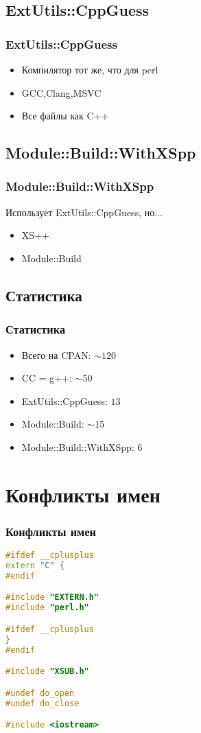 \documentclass[utf8x,smaller]{beamer}
\begin{document}
\subsection{ExtUtils::CppGuess}
\begin{frame}[fragile]
    \frametitle{ExtUtils::CppGuess}
    
    \begin{itemize}
        \item Компилятор тот же, что для perl
        \item GCC,Clang,MSVC
        \item Все файлы как C++
    \end{itemize}
\end{frame}

\subsection{Module::Build::WithXSpp}
\begin{frame}
    \frametitle{Module::Build::WithXSpp}
    Использует ExtUtils::CppGuess, но...
    \begin{itemize}
        \item XS++
        \item Module::Build
    \end{itemize}
\end{frame}

\subsection{Статистика}
\begin{frame}
    \frametitle{Статистика}
    \begin{itemize}
        \item Всего на CPAN: $\sim120$
        \item CC = g++: $\sim50$
        \item ExtUtils::CppGuess: $13$
        \item Module::Build: $\sim15$
        \item Module::Build::WithXSpp: $6$
    \end{itemize}
\end{frame}

\section{Конфликты имен}

\begin{frame}[fragile]
    \frametitle{Конфликты имен}
    \begin{lstlisting}[language=C++,style=PerlXS]
#ifdef __cplusplus
extern "C" {
#endif

#include "EXTERN.h"
#include "perl.h"

#ifdef __cplusplus
}
#endif

#include "XSUB.h"

#undef do_open
#undef do_close

#include <iostream>
    \end{lstlisting}
\end{frame}
\end{document}
